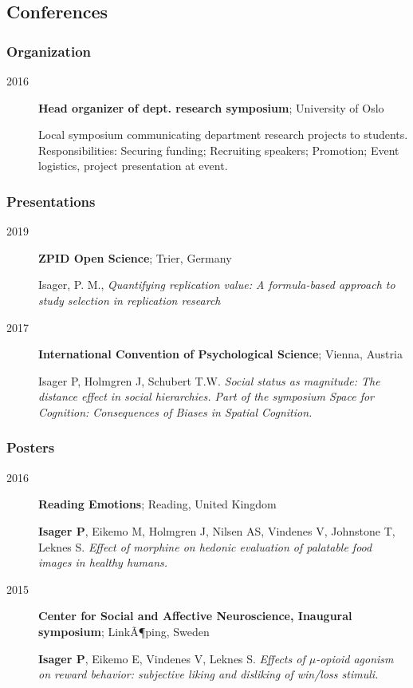 \documentclass[]{article}
\begin{document}
\subsection{Conferences}\label{conferences}

\subsubsection{Organization}\label{organization}

\begin{description}
\item[2016]
\textbf{Head organizer of dept. research symposium}; University of Oslo

Local symposium communicating department research projects to students.
Responsibilities: Securing funding; Recruiting speakers; Promotion;
Event logistics, project presentation at event.
\end{description}

\subsubsection{Presentations}\label{presentations}

\begin{description}
\item[2019]
\textbf{ZPID Open Science}; Trier, Germany

Isager, P. M., \emph{Quantifying replication value: A formula-based
approach to study selection in replication research}
\item[2017]
\textbf{International Convention of Psychological Science}; Vienna,
Austria

Isager P, Holmgren J, Schubert T.W. \emph{Social status as magnitude:
The distance effect in social hierarchies. Part of the symposium Space
for Cognition: Consequences of Biases in Spatial Cognition.}
\end{description}

\subsubsection{Posters}\label{posters}

\begin{description}
\item[2016]
\textbf{Reading Emotions}; Reading, United Kingdom

\textbf{Isager P}, Eikemo M, Holmgren J, Nilsen AS, Vindenes V,
Johnstone T, Leknes S. \emph{Effect of morphine on hedonic evaluation of
palatable food images in healthy humans.}
\item[2015]
\textbf{Center for Social and Affective Neuroscience, Inaugural
symposium}; LinkÃ¶ping, Sweden

\textbf{Isager P}, Eikemo E, Vindenes V, Leknes S. \emph{Effects of
\(\mu\)-opioid agonism on reward behavior: subjective liking and
disliking of win/loss stimuli.}
\end{description}
\end{document}
